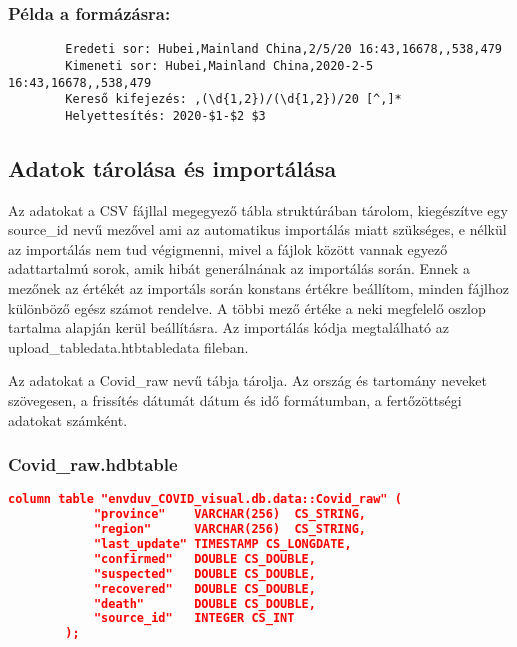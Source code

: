 \documentclass[12pt,a4papaer]{article}
\begin{document}
    \subsubsection{Példa a formázásra: }
        \begin{verbatim}
        Eredeti sor: Hubei,Mainland China,2/5/20 16:43,16678,,538,479
        Kimeneti sor: Hubei,Mainland China,2020-2-5 16:43,16678,,538,479
        Kereső kifejezés: ,(\d{1,2})/(\d{1,2})/20 [^,]*
        Helyettesítés: 2020-$1-$2 $3
        \end{verbatim}
    \subsection{Adatok tárolása és importálása}

    Az adatokat a CSV fájllal megegyező tábla struktúrában tárolom, kiegészítve egy source\_id nevű mezővel ami az automatikus importálás miatt szükséges, 
    e nélkül az importálás nem tud végigmenni, mivel a fájlok között vannak egyező adattartalmú sorok, amik hibát generálnának az importálás során.
    Ennek a mezőnek az értékét az importáls során konstans értékre beállítom, minden fájlhoz különböző egész számot rendelve.
    A többi mező értéke a neki megfelelő oszlop tartalma alapján kerül beállításra.
    Az importálás kódja megtalálható az upload\_tabledata.htbtabledata fileban.

    \par
    Az adatokat a Covid\_raw nevű tábja tárolja. Az ország és tartomány neveket szövegesen, a frissítés dátumát dátum és idő formátumban, a fertőzöttségi adatokat számként.

    \subsubsection{Covid\_raw.hdbtable}
    \begin{lstlisting}[language=json]
        column table "envduv_COVID_visual.db.data::Covid_raw" (
            "province"    VARCHAR(256)	CS_STRING,
            "region"      VARCHAR(256)	CS_STRING,
            "last_update" TIMESTAMP CS_LONGDATE,
            "confirmed"   DOUBLE CS_DOUBLE,
            "suspected"   DOUBLE CS_DOUBLE,
            "recovered"   DOUBLE CS_DOUBLE,
            "death"       DOUBLE CS_DOUBLE,
            "source_id"   INTEGER CS_INT
        );
    \end{lstlisting}
\end{document}

